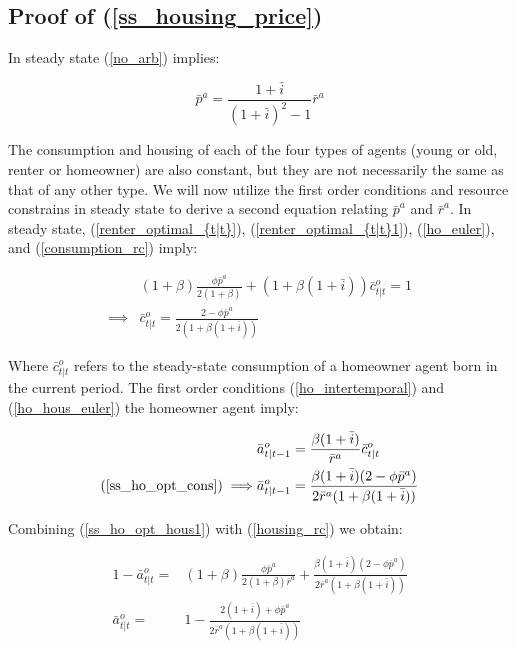 \documentclass{article}
\begin{document}
\begin{appendix}
\section{Proof of (\ref{ss_housing_price})}

In steady state (\ref{no_arb}) implies:

\begin{equation}
    \bar{p}^a = \frac{1+\bar{i}}{(1+\bar{i})^2 - 1}\bar{r}^a \label{ss_no_arb}
\end{equation}

The consumption and housing of each of the four types of agents (young or old, renter or homeowner) are also constant, but they are not necessarily the same as that of any other type. We will now utilize the first order conditions and resource constrains in steady state to derive a second equation relating $\bar{p}^a$ and $\bar{r}^a$. In steady state, (\ref{renter_optimal_{t|t}}), (\ref{renter_optimal_{t|t}1}), (\ref{ho_euler}), and (\ref{consumption_rc}) imply:

\begin{align}
    & (1+\beta)\frac{\phi\bar{p}^a}{2(1+\beta)} + (1+\beta(1+\bar{i})) \bar{c}^o_{t|t} = 1 \nonumber \\
    \implies& \bar{c}^o_{t|t} = \frac{2-\phi\bar{p}^a}{2(1+\beta(1+\bar{i}))} \label{ss_ho_opt_cons}
\end{align}

Where $\bar{c}^o_{t|t}$ refers to the steady-state consumption of a homeowner agent born in the current period. The first order conditions (\ref{ho_intertemporal}) and (\ref{ho_hous_euler}) the homeowner agent imply:

\begin{align}
    & \bar{a}^o_{t|t-1} = \frac{\beta(1+\bar{i})}{\bar{r}^a} \bar{c}^o_{t|t} \\
    \text{(\ref{ss_ho_opt_cons})} \implies& \bar{a}^o_{t|t-1} = \frac{\beta(1+\bar{i})(2-\phi\bar{p}^a)}{2\bar{r}^a(1+\beta(1+\bar{i}))} \label{ss_ho_opt_hous1}
\end{align}

Combining (\ref{ss_ho_opt_hous1}) with (\ref{housing_rc}) we obtain:

\begin{align}
    1-\bar{a}^o_{t|t} =& (1+\beta) \frac{\phi \bar{p}^a}{2(1+\beta)\bar{r}^a} + \frac{\beta(1+\bar{i})(2-\phi\bar{p}^a)}{2\bar{r}^a(1+\beta(1+\bar{i}))} \nonumber \\
    \bar{a}^o_{t|t} =& 1 - \frac{2(1+\bar{i})+\phi \bar{p}^a}{2\bar{r}^a(1+\beta(1+\bar{i}))} \label{ss_ho_opt_hous}
\end{align}


\end{appendix}
\end{document}
